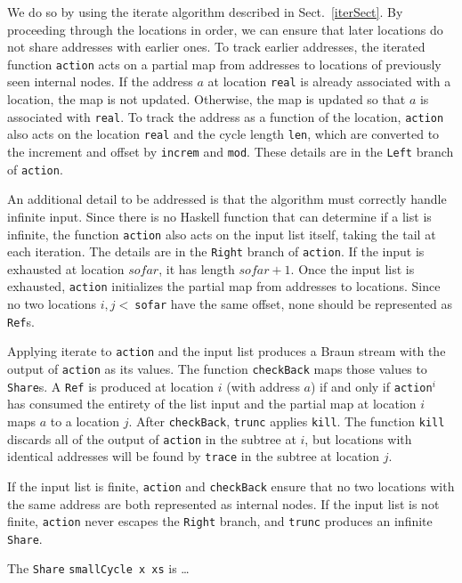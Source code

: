 \documentclass[envcountsect]{llncs}
\newcommand{\share}{{\tt Share} }
\begin{document}
We do so by using the iterate algorithm described in Sect.~\ref{iterSect}.
By proceeding through the locations in order, we can ensure that later locations do not share addresses with earlier ones.
To track earlier addresses, the iterated function {\tt action} acts on a partial map from addresses to locations of previously seen internal nodes.
If the address $a$ at location {\tt real} is already associated with a location, the map is not updated.
Otherwise, the map is updated so that $a$ is associated with {\tt real}.
To track the address as a function of the location, {\tt action} also acts on the location {\tt real} and the cycle length {\tt len}, which are converted to the increment and offset by {\tt increm} and {\tt mod}.
These details are in the {\tt Left} branch of {\tt action}.

An additional detail to be addressed is that the algorithm must correctly handle infinite input.
Since there is no Haskell function that can determine if a list is infinite, the function {\tt action} also acts on the input list itself, taking the tail at each iteration.
The details are in the {\tt Right} branch of {\tt action}.
If the input is exhausted at location $sofar$, it has length $sofar+1$.
Once the input list is exhausted, {\tt action} initializes the partial map from addresses to locations.
Since no two locations $i,j <\ ${\tt sofar} have the same offset, none should be represented as {\tt Ref}s.

Applying iterate to {\tt action} and the input list produces a Braun stream with the output of {\tt action} as its values.
The function {\tt checkBack} maps those values to {\tt Share}s.
A {\tt Ref} is produced at location $i$ (with address $a$) if and only if {\tt action}$^i$ has consumed the entirety of the list input and the partial map at location $i$ maps $a$ to a location $j$. %
After {\tt checkBack}, {\tt trunc} applies {\tt kill}.
The function {\tt kill} discards all of the output of {\tt action} in the subtree at $i$, but locations with identical addresses will be found by {\tt trace} in the subtree at location $j$.

If the input list is finite, {\tt action} and {\tt checkBack} ensure that no two locations with the same address are both represented as internal nodes.
If the input list is not finite, {\tt action} never escapes the {\tt Right} branch, and {\tt trunc} produces an infinite {\tt Share}.

The \share {\tt smallCycle x xs} is \ldots
\end{document}
